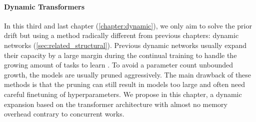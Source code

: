 \paragraph{Dynamic Transformers} In this third and last chapter (\autoref{chapter:dynamic}), we only
aim to solve the prior drift but using a method radically different from previous chapters: dynamic
networks (\autoref{sec:related_structural}). Previous dynamic networks usually expand their capacity
by a large margin during the continual training to handle the growing amount of tasks to learn
\citep{yan2021der}. To avoid a parameter count unbounded growth, the models are usually pruned
aggressively. The main drawback of these methods is that the pruning can still result in models too
large and often need careful finetuning of hyperparameters. We propose in this chapter, a dynamic
expansion based on the transformer architecture with almost no memory overhead contrary to
concurrent works.
